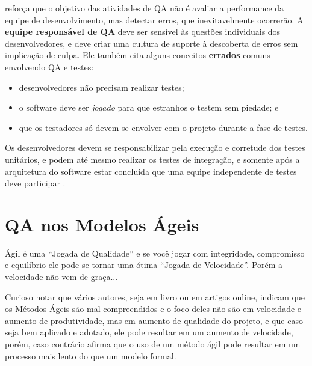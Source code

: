 \documentclass[
	12pt,				%
	openright,			%
	oneside,			%
	a4paper,			%
	english,			%
	brazil,				%
	]{abntex2}
\begin{document}
 reforça que o objetivo das atividades de QA não é avaliar a performance da equipe de desenvolvimento, mas detectar erros, que inevitavelmente ocorrerão. A \textbf{equipe responsável de QA} deve ser sensível às questões individuais dos desenvolvedores, e deve criar uma cultura de suporte à descoberta de erros sem implicação de culpa. Ele também cita alguns conceitos \textbf{errados} comuns envolvendo QA e testes:

\begin{itemize}
    \item desenvolvedores não precisam realizar testes;
    \item o software deve ser \emph{jogado} para que estranhos o testem sem piedade; e
    \item que os testadores só devem se envolver com o projeto durante a fase de testes.
\end{itemize}

Os desenvolvedores devem se responsabilizar pela execução e corretude dos testes unitários, e podem até mesmo realizar os testes de integração, e somente após a arquitetura do software estar concluída que uma equipe independente de testes deve participar \cite{SOMMERVILLE2011}.

\section{QA nos Modelos Ágeis}
\begin{citacao}
Ágil é uma ``Jogada de Qualidade'' e se você jogar com integridade, compromisso e equilíbrio ele pode se tornar uma ótima ``Jogada de Velocidade''. Porém a velocidade não vem de graça...\cite{galen2014}
\end{citacao}

Curioso notar que vários autores, seja em livro ou em artigos online, indicam que os Métodos Ágeis são mal compreendidos e o foco deles não são em velocidade e aumento de produtividade, mas em aumento de qualidade do projeto, e que caso seja bem aplicado e adotado, ele pode resultar em um aumento de velocidade, porém, caso contrário  afirma que o uso de um método ágil pode resultar em um processo mais lento do que um modelo formal.
\end{document}
